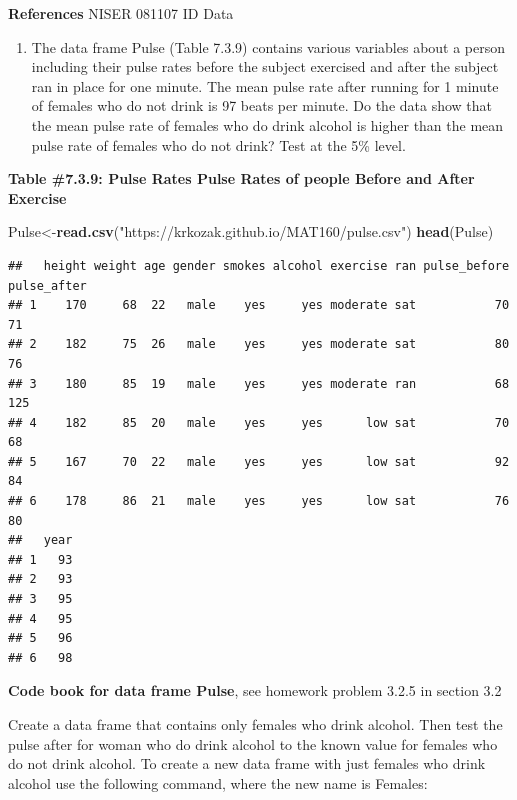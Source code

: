\documentclass[
]{book}
\newenvironment{Shaded}{\begin{snugshade}}{\end{snugshade}}
\newcommand{\KeywordTok}[1]{\textcolor[rgb]{0.13,0.29,0.53}{\textbf{#1}}}
\newcommand{\NormalTok}[1]{#1}
\newcommand{\StringTok}[1]{\textcolor[rgb]{0.31,0.60,0.02}{#1}}
\providecommand{\tightlist}{%
  \setlength{\itemsep}{0pt}\setlength{\parskip}{0pt}}
\begin{document}
\textbf{References}
NISER 081107 ID Data

\begin{enumerate}
\def\labelenumi{\arabic{enumi}.}
\setcounter{enumi}{3}
\tightlist
\item
  The data frame Pulse (Table 7.3.9) contains various variables about a person including their pulse rates before the subject exercised and after the subject ran in place for one minute. The mean pulse rate after running for 1 minute of females who do not drink is 97 beats per minute. Do the data show that the mean pulse rate of females who do drink alcohol is higher than the mean pulse rate of females who do not drink? Test at the 5\% level.
\end{enumerate}

\textbf{Table \#7.3.9: Pulse Rates Pulse Rates of people Before and After Exercise}

\begin{Shaded}
\begin{Highlighting}[]
\NormalTok{Pulse<-}\KeywordTok{read.csv}\NormalTok{(}\StringTok{"https://krkozak.github.io/MAT160/pulse.csv"}\NormalTok{)}
\KeywordTok{head}\NormalTok{(Pulse)}
\end{Highlighting}
\end{Shaded}

\begin{verbatim}
##   height weight age gender smokes alcohol exercise ran pulse_before pulse_after
## 1    170     68  22   male    yes     yes moderate sat           70          71
## 2    182     75  26   male    yes     yes moderate sat           80          76
## 3    180     85  19   male    yes     yes moderate ran           68         125
## 4    182     85  20   male    yes     yes      low sat           70          68
## 5    167     70  22   male    yes     yes      low sat           92          84
## 6    178     86  21   male    yes     yes      low sat           76          80
##   year
## 1   93
## 2   93
## 3   95
## 4   95
## 5   96
## 6   98
\end{verbatim}

\textbf{Code book for data frame Pulse}, see homework problem 3.2.5 in section 3.2

Create a data frame that contains only females who drink alcohol. Then test the pulse after for woman who do drink alcohol to the known value for females who do not drink alcohol. To create a new data frame with just females who drink alcohol use the following command, where the new name is Females:
\end{document}
